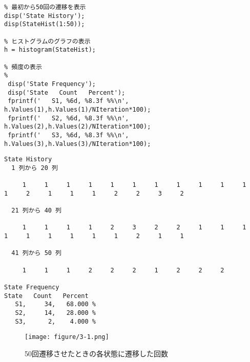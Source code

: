\documentclass[documentclass]{jsarticle}
\begin{document}
\begin{lstlisting}[caption=状態変化を見るプログラム]
%% Evaluation
% 最初から50回の遷移を表示
disp('State History');
disp(StateHist(1:50));

% ヒストグラムのグラフの表示
h = histogram(StateHist);

% 頻度の表示
%
 disp('State Frequency');
 disp('State   Count   Percent');
 fprintf('   S1, %6d, %8.3f %%\n', h.Values(1),h.Values(1)/NIteration*100);
 fprintf('   S2, %6d, %8.3f %%\n', h.Values(2),h.Values(2)/NIteration*100);
 fprintf('   S3, %6d, %8.3f %%\n', h.Values(3),h.Values(3)/NIteration*100);

\end{lstlisting}

\begin{lstlisting}[caption=ソースコード3を実行したときの結果]
  State History
  1 列から 20 列

     1     1     1     1     1     1     1     1     1     1     1     1     2     1     1     1     2     2     3     2

  21 列から 40 列

     1     1     1     1     2     3     2     2     1     1     1     1     1     1     1     1     1     2     1     1

  41 列から 50 列

     1     1     1     2     2     2     1     2     2     2

State Frequency
State   Count   Percent
   S1,     34,   68.000 %
   S2,     14,   28.000 %
   S3,      2,    4.000 %
\end{lstlisting}

\begin{figure}[H]
  \begin{center}
    \texttt{[image: figure/3-1.png]}
  \end{center}
  \caption{50回遷移させたときの各状態に遷移した回数}
  \label{fig:3-1}
\end{figure}
\end{document}

